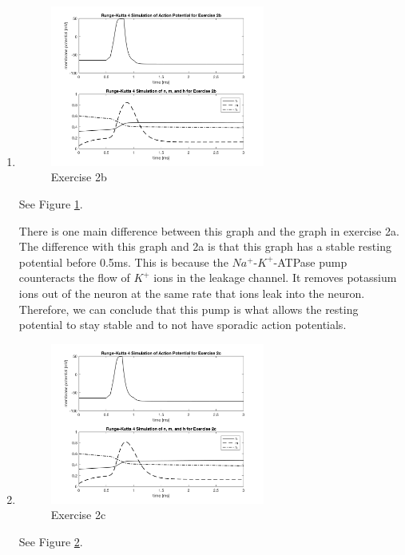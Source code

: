 \documentclass[12pt]{article}
\begin{document}
\begin{enumerate}
\begin{enumerate}
			\item
				\begin{figure}[h!]
  			 \includegraphics[width=0.666\textwidth]{2b-1}
  			 \centering
         \caption{Exercise 2b}
         \label{fig:2b-1}
       \end{figure}
				See Figure \ref{fig:2b-1}.
				
				There is one main difference between this graph and the graph in exercise 2a. The difference with this graph and 2a is that this graph has a stable resting potential before 0.5ms. This is because the $Na^+$-$K^+$-ATPase pump counteracts the flow of $K^+$ ions in the leakage channel. It removes potassium ions out of the neuron at the same rate that ions leak into the neuron. Therefore, we can conclude that this pump is what allows the resting potential to stay stable and to not have sporadic action potentials.
			
			\item
				\begin{figure}[h!]
  			 \includegraphics[width=0.666\textwidth]{2c-1}
  			 \centering
         \caption{Exercise 2c}
         \label{fig:2c-1}
       \end{figure}
				See Figure \ref{fig:2c-1}.
				

\end{enumerate}
\end{enumerate}
\end{document}
